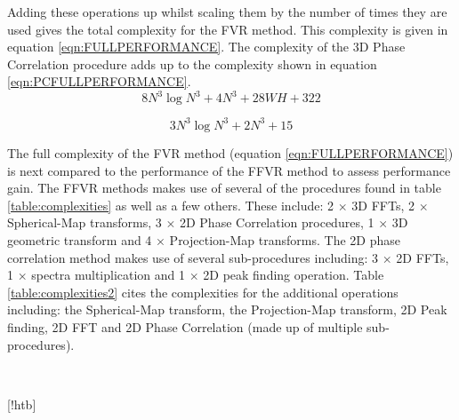 Adding these operations up whilst scaling them by the number of times they are used gives the total complexity for the FVR method. This complexity is given in equation \ref{eqn:FULLPERFORMANCE}. The complexity of the 3D Phase Correlation procedure adds up to the complexity shown in equation \ref{eqn:PCFULLPERFORMANCE}. \\

\begin{equation} \label{eqn:FULLPERFORMANCE}
8N^3\log{N^3} + 4N^3 + 28WH + 322
\end{equation}

\begin{equation} \label{eqn:PCFULLPERFORMANCE}
3N^3\log{N^3} + 2N^3 + 15
\end{equation}


The full complexity of the FVR method (equation \ref{eqn:FULLPERFORMANCE}) is next compared to the performance of the FFVR method to assess performance gain. The FFVR methods makes use of several of the procedures found in table \ref{table:complexities} as well as a few others. These include: 2 $\times$ 3D FFTs, 2 $\times$ Spherical-Map transforms, 3 $\times$ 2D Phase Correlation procedures, 1 $\times$ 3D geometric transform and 4 $\times$ Projection-Map transforms. The 2D phase correlation method makes use of several sub-procedures including: 3 $\times$ 2D FFTs, 1 $\times$ spectra multiplication and 1 $\times$ 2D peak finding operation. Table \ref{table:complexities2} cites the complexities for the additional operations including: the Spherical-Map transform, the Projection-Map transform, 2D Peak finding, 2D FFT and 2D Phase Correlation (made up of multiple sub-procedures). \\



\begin{table}[!htb]
\centering
{}
\\
\caption{Complexities for given Procedures}
\label{table:complexities2}
\end{table}[!htb]

